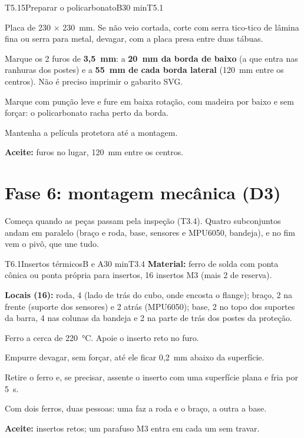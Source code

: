 \documentclass[11pt,a4paper]{article}
\begin{document}
\begin{tarefa}{T5.15}{Preparar o policarbonato}{B}{30 min}{T5.1}
\begin{passos}
  \item Placa de 230 $\times$ 230~mm. Se não veio cortada, corte com serra tico-tico de
    lâmina fina ou serra para metal, devagar, com a placa presa entre duas tábuas.
  \item Marque os 2 furos de \textbf{3,5~mm}: a \textbf{20~mm da borda de baixo} (a que
    entra nas ranhuras dos postes) e a \textbf{55~mm de cada borda lateral} (120~mm entre os
    centros). Não é preciso imprimir o gabarito SVG.
  \item Marque com punção leve e fure em baixa rotação, com madeira por baixo e sem forçar:
    o policarbonato racha perto da borda.
  \item Mantenha a película protetora até a montagem.
\end{passos}
\textbf{Aceite:} furos no lugar, 120~mm entre os centros.
\end{tarefa}

\section{Fase 6: montagem mecânica (D3)}
\label{sec:fase6}

Começa quando as peças passam pela inspeção (T3.4). Quatro subconjuntos andam em paralelo
(braço e roda, base, sensores e MPU6050, bandeja), e no fim vem o pivô, que une tudo.

\begin{tarefa}[critica]{T6.1}{Insertos térmicos}{B e A}{30 min}{T3.4}
\textbf{Material:} ferro de solda com ponta cônica ou ponta própria para insertos, 16
insertos M3 (mais 2 de reserva).

\textbf{Locais (16):} roda, 4 (lado de trás do cubo, onde encosta o flange); braço, 2 na
frente (suporte dos sensores) e 2 atrás (MPU6050); base, 2 no topo dos suportes da barra,
4 nas colunas da bandeja e 2 na parte de trás dos postes da proteção.
\begin{passos}
  \item Ferro a cerca de 220~°C. Apoie o inserto reto no furo.
  \item Empurre devagar, sem forçar, até ele ficar 0,2~mm abaixo da superfície.
  \item Retire o ferro e, se precisar, assente o inserto com uma superfície plana e fria
    por 5~s.
  \item Com dois ferros, duas pessoas: uma faz a roda e o braço, a outra a base.
\end{passos}
\textbf{Aceite:} insertos retos; um parafuso M3 entra em cada um sem travar.
\end{tarefa}
\end{document}

